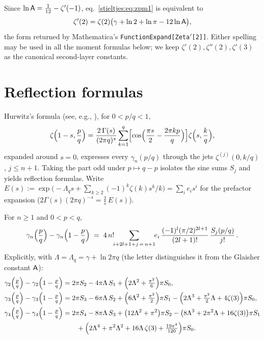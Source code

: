 \begin{remark}\label{stieltjes:rem:glaisher}
Since $\ln\mathsf{A}=\tfrac1{12}-\zeta'(-1)$, eq.~\eqref{stieltjes:eq:zpm1} is
equivalent to
\[
\zeta'(2)=\zeta(2)\bigl(\gamma+\ln 2+\ln\pi-12\ln\mathsf{A}\bigr),
\]
the form returned by Mathematica's
\texttt{FunctionExpand[Zeta$'$[2]]}. Either spelling may be used in all the
moment formulas below; we keep $\zeta'(2),\zeta''(2),\zeta'(3)$ as the
canonical second-layer constants.
\end{remark}

\section{Reflection formulas}\label{stieltjes:sec:reflection}

Hurwitz's formula (see, e.g., \cite[Ch.~12]{stieltjes:ApostolBook}), for $0<p/q<1$,
\[
\zeta\Bigl(1-s,\frac pq\Bigr)
=\frac{2\,\Gamma(s)}{(2\pi q)^{s}}
\sum_{k=1}^{q}\Bigl[\cos\Bigl(\frac{\pi s}{2}-\frac{2\pi kp}{q}\Bigr)\Bigr]
\zeta\Bigl(s,\frac kq\Bigr),
\]
expanded around $s=0$, expresses every $\gamma_n(p/q)$ through the jets
$\zeta^{(j)}(0,k/q)$, $j\le n+1$. Taking the part odd under
$p\mapsto q-p$ isolates the sine sums $S_j$ and yields reflection formulas.
Write
$E(s):=\exp\bigl(-\Lambda_qs+\sum_{k\ge2}(-1)^k\zeta(k)s^k/k\bigr)=\sum_i e_is^i$
for the prefactor expansion
($2\Gamma(s)(2\pi q)^{-s}=\tfrac2s\,E(s)$).

\begin{theorem}\label{stieltjes:thm:reflgen}
For $n\ge1$ and $0<p<q$,
\[
\gamma_n\Bigl(\frac pq\Bigr)-\gamma_n\Bigl(1-\frac pq\Bigr)
\;=\;4\,n!\!\!\sum_{i+2l+1+j\,=\,n+1}\!\! e_i\,
\frac{(-1)^l(\pi/2)^{2l+1}}{(2l+1)!}\,\frac{S_j(p/q)}{j!}\,.
\]
Explicitly, with $\Lambda=\Lambda_q=\gamma+\ln 2\pi q$ (the letter
distinguishes it from the Glaisher constant $\mathsf{A}$):
\begin{align}
\gamma_2\Bigl(\tfrac pq\Bigr)-\gamma_2\Bigl(1-\tfrac pq\Bigr)
&=2\pi S_2-4\pi \Lambda\,S_1+\Bigl(2\Lambda^2+\tfrac{\pi^2}{6}\Bigr)\pi S_0,
\label{stieltjes:eq:refl2}\\
\gamma_3\Bigl(\tfrac pq\Bigr)-\gamma_3\Bigl(1-\tfrac pq\Bigr)
&=2\pi S_3-6\pi \Lambda\,S_2+\Bigl(6\Lambda^2+\tfrac{\pi^2}{2}\Bigr)\pi S_1
-\Bigl(2\Lambda^3+\tfrac{\pi^2}{2}\Lambda+4\zeta(3)\Bigr)\pi S_0,
\label{stieltjes:eq:refl3}\\
\gamma_4\Bigl(\tfrac pq\Bigr)-\gamma_4\Bigl(1-\tfrac pq\Bigr)
&=2\pi S_4-8\pi \Lambda\,S_3+\bigl(12\Lambda^2+\pi^2\bigr)\pi S_2
-\bigl(8\Lambda^3+2\pi^2\Lambda+16\zeta(3)\bigr)\pi S_1\notag\\
&\qquad
+\Bigl(2\Lambda^4+\pi^2\Lambda^2+16\Lambda\,\zeta(3)+\tfrac{19\pi^4}{120}\Bigr)\pi S_0 .
\label{stieltjes:eq:refl4}
\end{align}
\end{theorem}

